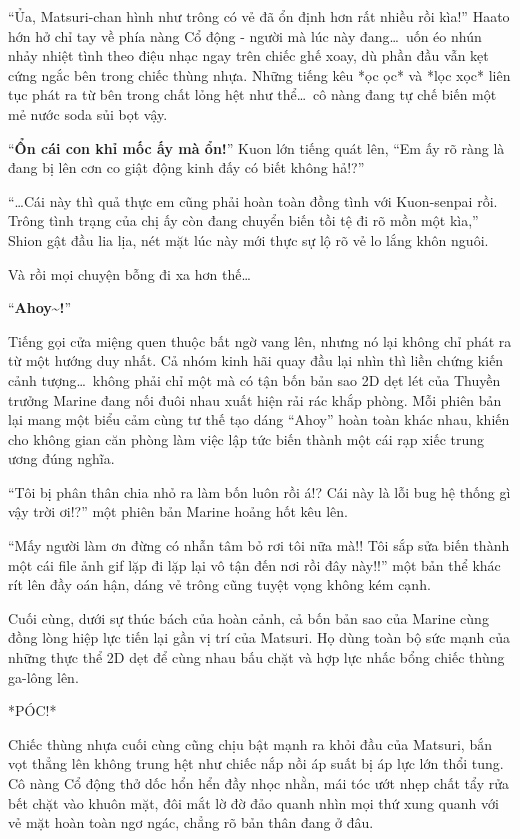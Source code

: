 \documentclass[../main.tex]{subfiles}
\begin{document}
``Ủa, Matsuri-chan hình như trông có vẻ đã ổn định hơn rất nhiều rồi kìa!'' Haato hớn hở chỉ tay về phía nàng Cổ động - người mà lúc này đang\dots\ uốn éo nhún nhảy nhiệt tình theo điệu nhạc ngay trên chiếc ghế xoay, dù phần đầu vẫn kẹt cứng ngắc bên trong chiếc thùng nhựa. Những tiếng kêu *ọc ọc* và *lọc xọc* liên tục phát ra từ bên trong chất lỏng hệt như thể\dots\ cô nàng đang tự chế biến một mẻ nước soda sủi bọt vậy.

``\textbf{Ổn cái con khỉ mốc ấy mà ổn!}'' Kuon lớn tiếng quát lên, ``Em ấy rõ ràng là đang bị lên cơn co giật động kinh đấy có biết không hả!?''

``\dots Cái này thì quả thực em cũng phải hoàn toàn đồng tình với Kuon-senpai rồi. Trông tình trạng của chị ấy còn đang chuyển biến tồi tệ đi rõ mồn một kìa,'' Shion gật đầu lia lịa, nét mặt lúc này mới thực sự lộ rõ vẻ lo lắng khôn nguôi.

Và rồi mọi chuyện bỗng đi xa hơn thế\dots

``\textbf{Ahoy\~{}!}''

Tiếng gọi cửa miệng quen thuộc bất ngờ vang lên, nhưng nó lại không chỉ phát ra từ một hướng duy nhất. Cả nhóm kinh hãi quay đầu lại nhìn thì liền chứng kiến cảnh tượng\dots\ không phải chỉ một mà có tận bốn bản sao 2D dẹt lét của Thuyền trưởng Marine đang nối đuôi nhau xuất hiện rải rác khắp phòng. Mỗi phiên bản lại mang một biểu cảm cùng tư thế tạo dáng ``Ahoy'' hoàn toàn khác nhau, khiến cho không gian căn phòng làm việc lập tức biến thành một cái rạp xiếc trung ương đúng nghĩa.


``Tôi bị phân thân chia nhỏ ra làm bốn luôn rồi á!? Cái này là lỗi bug hệ thống gì vậy trời ơi!?'' một phiên bản Marine hoảng hốt kêu lên.

``Mấy người làm ơn đừng có nhẫn tâm bỏ rơi tôi nữa mà!! Tôi sắp sửa biến thành một cái file ảnh gif lặp đi lặp lại vô tận đến nơi rồi đây này!!'' một bản thể khác rít lên đầy oán hận, dáng vẻ trông cũng tuyệt vọng không kém cạnh.

Cuối cùng, dưới sự thúc bách của hoàn cảnh, cả bốn bản sao của Marine cùng đồng lòng hiệp lực tiến lại gần vị trí của Matsuri. Họ dùng toàn bộ sức mạnh của những thực thể 2D dẹt để cùng nhau bấu chặt và hợp lực nhấc bổng chiếc thùng ga-lông lên.

*PÓC!*

Chiếc thùng nhựa cuối cùng cũng chịu bật mạnh ra khỏi đầu của Matsuri, bắn vọt thẳng lên không trung hệt như chiếc nắp nồi áp suất bị áp lực lớn thổi tung. Cô nàng Cổ động thở dốc hổn hển đầy nhọc nhằn, mái tóc ướt nhẹp chất tẩy rửa bết chặt vào khuôn mặt, đôi mắt lờ đờ đảo quanh nhìn mọi thứ xung quanh với vẻ mặt hoàn toàn ngơ ngác, chẳng rõ bản thân đang ở đâu.
\end{document}
